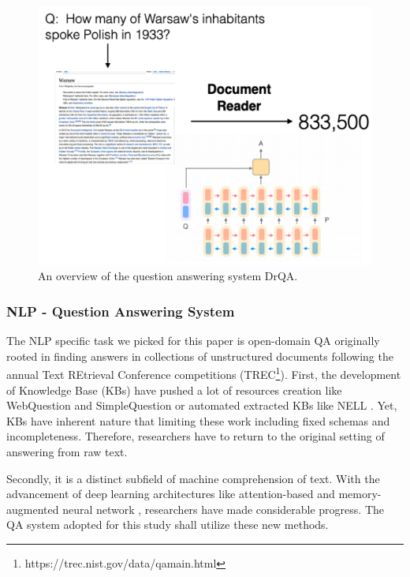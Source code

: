 \begin{figure}[!t]
    \centering
    \includegraphics[width=\linewidth]{img/QA.png}
    \caption{An overview of the question answering system DrQA.}
    \label{fig:DrQA_overview}
    \vspace{-10pt}
\end{figure}



\subsubsection{NLP - Question Answering System}

The NLP specific task we picked for this paper is open-domain QA originally rooted in finding answers in collections of unstructured documents following the annual Text REtrieval Conference competitions (TREC\footnote{https://trec.nist.gov/data/qamain.html}). First, the development of Knowledge Base (KBs) have pushed a lot of resources creation like WebQuestion \cite{webquestion} and SimpleQuestion \cite{simplequestion} or automated extracted KBs like NELL \cite{}. Yet, KBs have inherent nature that limiting these work including fixed schemas and incompleteness. Therefore, researchers have to return to the original setting of answering from raw text. 



Secondly, it is a distinct subfield of machine comprehension of text. With the advancement of deep learning architectures like attention-based and memory-augmented neural network \cite{}, researchers have made considerable progress.  The QA system adopted for this study shall utilize these new methods.


